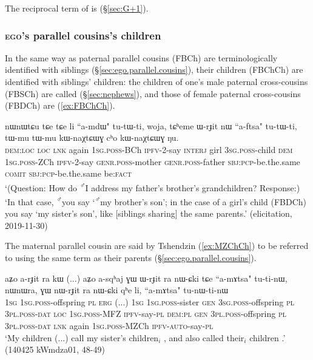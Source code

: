 The reciprocal term of  is  (§\ref{sec:G+1}).

\subsubsection{\textsc{ego}'s parallel cousins's children} \label{sec:FBCh.MZCh.Ch}
In the same way as paternal parallel cousins (FBCh) are terminologically identified with siblings (§\ref{sec:ego.parallel.cousins}), their children (FBChCh) are identified with siblings' children: the children of one's male paternal cross-cousins (FBSCh) are called  (§\ref{sec:nephews}), and those of female paternal cross-cousins (FBDCh) are  (\ref{ex:FBChCh}).

\begin{exe}
\ex \label{ex:FBChCh}
\gll nɯnɯtɕu tɕe tɕe li ``a-mdɯ" tu-tɯ-ti, woja, tɕʰeme ɯ-rɟit nɯ ``a-ftsa" tu-tɯ-ti, tɯ-mu tɯ-mu kɯ-naχtɕɯɣ cʰo kɯ-naχtɕɯɣ ŋu.\\
\textsc{dem}:\textsc{loc} \textsc{loc} \textsc{lnk} again \textsc{1sg}.\textsc{poss}-BCh \textsc{ipfv}-2-say \textsc{interj} girl \textsc{3sg}.\textsc{poss}-child \textsc{dem} \textsc{1sg}.\textsc{poss}-ZCh  \textsc{ipfv}-2-say \textsc{genr}.\textsc{poss}-mother \textsc{genr}.\textsc{poss}-father \textsc{sbj}:\textsc{pcp}-be.the.same \textsc{comit} \textsc{sbj}:\textsc{pcp}-be.the.same be:\textsc{fact}\\
\glt `(Question: How do \textsuperscript{♂}I address  my father's brother's grandchildren? Response:) `In that case, \textsuperscript{♂}you say  `\textsuperscript{♂}my brother's son'; in the case of a girl's child (FBDCh) you say  `my sister's son', like [siblings sharing] the same parents.' (elicitation, 2019-11-30)
\end{exe}

The maternal parallel cousin are said by Tshendzin (\ref{ex:MZChCh}) to be referred to using the same term as their parents  (§\ref{sec:ego.parallel.cousins}).

\begin{exe}
\ex \label{ex:MZChCh}
\gll aʑo a-rɟit ra kɯ (...) aʑo a-sqʰaj ɣɯ ɯ-rɟit ra nɯ-ɕki  tɕe ``a-mɤtsa" tu-ti-nɯ, nɯnɯra, ɣɯ nɯ-rɟit ra nɯ-ɕki qʰe li, ``a-mɤtsa" tu-nɯ-ti-nɯ  \\
\textsc{1sg} \textsc{1sg}.\textsc{poss}-offspring \textsc{pl} \textsc{erg} (...) \textsc{1sg} \textsc{1sg}.\textsc{poss}-sister \textsc{gen} \textsc{3sg}.\textsc{poss}-offspring \textsc{pl} \textsc{3pl}.\textsc{poss}-\textsc{dat} \textsc{loc} \textsc{1sg}.\textsc{poss}-MFZ \textsc{ipfv}-say-\textsc{pl} \textsc{dem}:\textsc{pl} \textsc{gen} \textsc{3pl}.\textsc{poss}-offspring \textsc{pl} \textsc{3pl}.\textsc{poss}-\textsc{dat} \textsc{lnk} again \textsc{1sg}.\textsc{poss}-MZCh \textsc{ipfv}-\textsc{auto}-say-\textsc{pl} \\
\glt `My children (...) call my sister's children$_i$ , and also called their$_i$ children .' (140425 kWmdza01, 48-49)
\end{exe}


